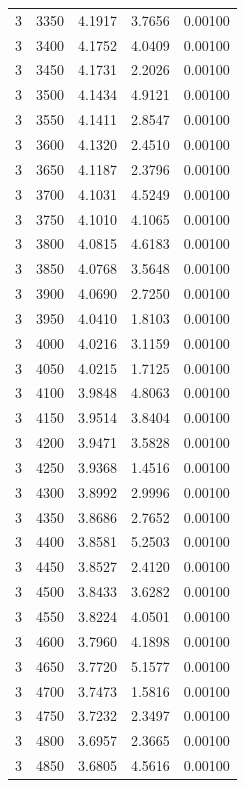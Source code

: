 \begin{longtable}{ccccc}
    3 & 3350 & 4.1917 & 3.7656 & 0.00100 \\
    3 & 3400 & 4.1752 & 4.0409 & 0.00100 \\
    3 & 3450 & 4.1731 & 2.2026 & 0.00100 \\
    3 & 3500 & 4.1434 & 4.9121 & 0.00100 \\
    3 & 3550 & 4.1411 & 2.8547 & 0.00100 \\
    3 & 3600 & 4.1320 & 2.4510 & 0.00100 \\
    3 & 3650 & 4.1187 & 2.3796 & 0.00100 \\
    3 & 3700 & 4.1031 & 4.5249 & 0.00100 \\
    3 & 3750 & 4.1010 & 4.1065 & 0.00100 \\
    3 & 3800 & 4.0815 & 4.6183 & 0.00100 \\
    3 & 3850 & 4.0768 & 3.5648 & 0.00100 \\
    3 & 3900 & 4.0690 & 2.7250 & 0.00100 \\
    3 & 3950 & 4.0410 & 1.8103 & 0.00100 \\
    3 & 4000 & 4.0216 & 3.1159 & 0.00100 \\
    3 & 4050 & 4.0215 & 1.7125 & 0.00100 \\
    3 & 4100 & 3.9848 & 4.8063 & 0.00100 \\
    3 & 4150 & 3.9514 & 3.8404 & 0.00100 \\
    3 & 4200 & 3.9471 & 3.5828 & 0.00100 \\
    3 & 4250 & 3.9368 & 1.4516 & 0.00100 \\
    3 & 4300 & 3.8992 & 2.9996 & 0.00100 \\
    3 & 4350 & 3.8686 & 2.7652 & 0.00100 \\
    3 & 4400 & 3.8581 & 5.2503 & 0.00100 \\
    3 & 4450 & 3.8527 & 2.4120 & 0.00100 \\
    3 & 4500 & 3.8433 & 3.6282 & 0.00100 \\
    3 & 4550 & 3.8224 & 4.0501 & 0.00100 \\
    3 & 4600 & 3.7960 & 4.1898 & 0.00100 \\
    3 & 4650 & 3.7720 & 5.1577 & 0.00100 \\
    3 & 4700 & 3.7473 & 1.5816 & 0.00100 \\
    3 & 4750 & 3.7232 & 2.3497 & 0.00100 \\
    3 & 4800 & 3.6957 & 2.3665 & 0.00100 \\
    3 & 4850 & 3.6805 & 4.5616 & 0.00100 \\

\end{longtable}
